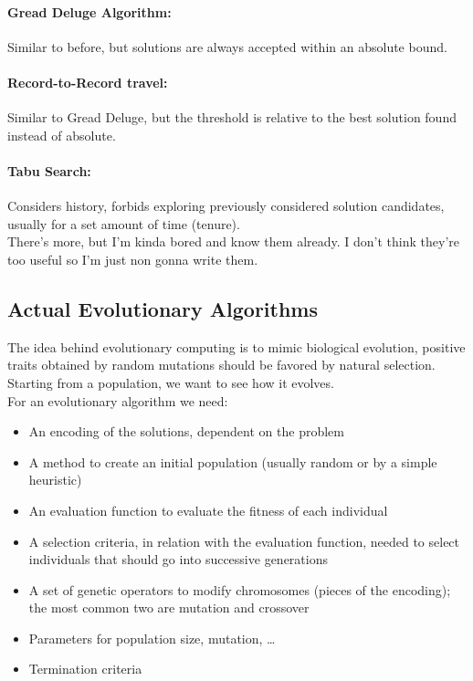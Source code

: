  \paragraph{Gread Deluge Algorithm:} Similar to before, but solutions are always accepted within an absolute bound.
 
 \paragraph{Record-to-Record travel:} Similar to Gread Deluge, but the threshold is relative to the best solution found instead of absolute.\\
 
 \paragraph{Tabu Search:} Considers history, forbids exploring previously considered solution candidates, usually for a set amount of time (tenure).\\
 
 There's more, but I'm kinda bored and know them already. I don't think they're too useful so I'm just non gonna write them.\\
 
 \subsection{Actual Evolutionary Algorithms}
 
 The idea behind evolutionary computing is to mimic biological evolution, positive traits obtained by random mutations should be favored by natural selection. Starting from a population, we want to see how it evolves.\\
 
 For  an evolutionary algorithm we need: 
 \begin{itemize}
 	\item An encoding of the solutions, dependent on the problem
 	\item A method to create an initial population (usually random or by a simple heuristic)
 	\item An evaluation function to evaluate the fitness of each individual 
 	\item A selection criteria, in relation with the evaluation function, needed to select individuals that should go into successive generations
 	\item A set of genetic operators to modify chromosomes (pieces of the encoding); the most common two are mutation and crossover
 	\item Parameters for population size, mutation, \dots
 	\item Termination criteria
 \end{itemize}
 
